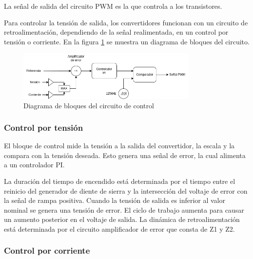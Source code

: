 La señal de salida del circuito PWM es la que controla a los transistores. 

Para controlar la tensión de salida, los convertidores funcionan con un circuito de retroalimentación,
dependiendo de la señal realimentada, en un control por tensión o corriente. En la figura \ref{fig:marco_teorico:control} se muestra un diagrama de bloques del circuito.

\begin{figure}[ht]
    \centering
    \includegraphics[width=0.8\textwidth]{images/compensador.png}
    \caption{Diagrama de bloques del circuito de control}
    \label{fig:marco_teorico:control}
\end{figure}

\subsubsection{Control por tensión}

El bloque de control mide la tensión a la salida del convertidor, la escala y la compara con la tensión deseada.
Esto genera una señal de error, la cual alimenta a un controlador PI.

La duración del tiempo de encendido está determinada por el tiempo entre el reinicio del generador de diente de sierra
y la intersección del voltaje de error con la señal de rampa positiva. 
Cuando la tensión de salida es inferior al valor nominal se genera una tensión de error. 
El ciclo de trabajo aumenta para causar un aumento posterior en el voltaje de salida. 
La dinámica de retroalimentación está determinada por el circuito amplificador de error que consta de Z1 y Z2.

\subsubsection{Control por corriente}

